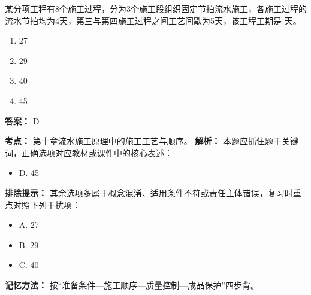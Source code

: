 \documentclass[UTF8,fontset=fandol,11pt]{ctexart}
\begin{document}
\vspace{0.2em}

\begin{quizbox}[title={第 11 题}]
某分项工程有8个施工过程，分为3个施工段组织固定节拍流水施工，各施工过程的流水节拍均为4天，第三与第四施工过程之间工艺间歇为5天，该工程工期是 天。\\
\begin{enumerate}[label=\Alph*.]
\item 27
\item 29
\item 40
\item 45
\end{enumerate}
\textbf{答案：} D
\vspace{0.25em}
\begin{answerbox}[title={考点解析}]
\textbf{考点：} 第十章流水施工原理中的施工工艺与顺序。
\textbf{解析：} 本题应抓住题干关键词，正确选项对应教材或课件中的核心表述：
\begin{itemize}
\item D. 45
\end{itemize}
\textbf{排除提示：} 其余选项多属于概念混淆、适用条件不符或责任主体错误，复习时重点对照下列干扰项：
\begin{itemize}
\item A. 27
\item B. 29
\item C. 40
\end{itemize}
\textbf{记忆方法：} 按“准备条件—施工顺序—质量控制—成品保护”四步背。
\end{answerbox}
\end{quizbox}

\vspace{0.2em}
\end{document}
